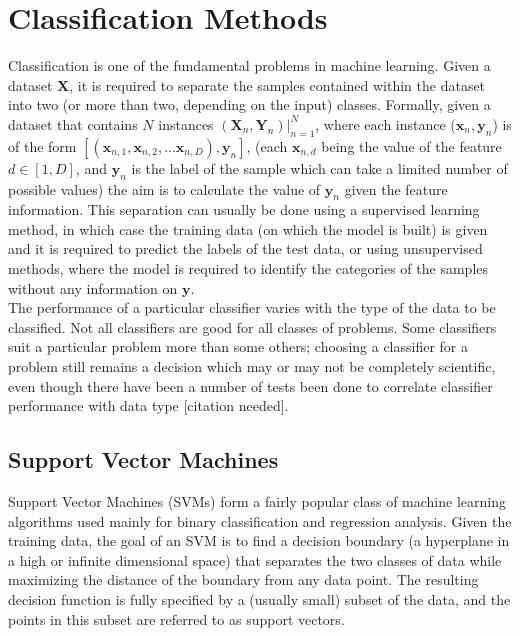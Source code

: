 \chapter{Classification Methods}
\label{chapter:Classification Methods}

Classification is one of the fundamental problems in machine learning. Given a dataset $\mathbf{X}$, it is required to separate the samples contained within the dataset into two (or more than two, depending on the input) classes. Formally, given a dataset that contains $N$ instances $(\mathbf{X}_{n}, \mathbf{Y}_n) |_{n = 1}^{N}$, where each instance ($\mathbf{x}_{n}, \mathbf{y}_{n}$) is of the form $[(\mathbf{x}_{n, 1}, \mathbf{x}_{n, 2}, ... \mathbf{x}_{n, D}), \mathbf{y}_{n}]$, (each $\mathbf{x}_{n, d}$ being the value of the feature $d \in [1, D]$, and $\mathbf{y}_{n}$ is the label of the sample which can take a limited number of possible values) the aim is to calculate the value of $\mathbf{y}_{n}$ given the feature information. This separation can usually be done using a supervised learning method, in which case the training data (on which the model is built) is given and it is required to predict the labels of the test data, or using unsupervised methods, where the model is required to identify the categories of the samples without any information on $\mathbf{y}$.\\

The performance of a particular classifier varies with the type of the data to be classified. Not all classifiers are good for all classes of problems. Some classifiers suit a particular problem more than some others; choosing a classifier for a problem still remains a decision which may or may not be completely scientific, even though there have been a number of tests been done to correlate classifier performance with data type [citation needed].

\section{Support Vector Machines}
Support Vector Machines (SVMs) form a fairly popular class of machine learning algorithms used mainly for binary classification and regression analysis. Given the training data, the goal of an SVM is to find a decision boundary (a hyperplane in a high or infinite dimensional space) that separates the two classes of data while maximizing the distance of the boundary from any data point. The resulting decision function is fully specified by a (usually small) subset of the data, and the points in this subset are referred to as support vectors.\\

